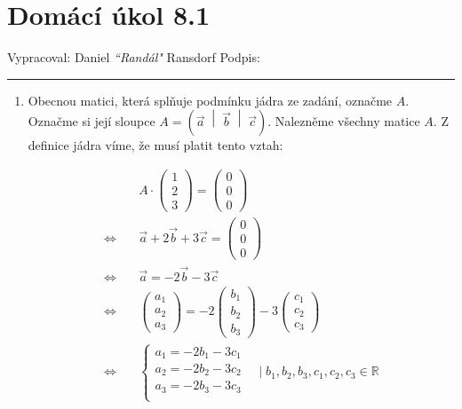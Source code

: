 \documentclass[12pt]{article}
\begin{document}
\section*{Domácí úkol 8.1}

Vypracoval: Daniel \textit{``Randál"} Ransdorf \hfill Podpis: \rule{4cm}{0.4pt}

\begin{enumerate}
  
  \item Obecnou matici, která splňuje podmínku jádra ze zadání, označme $A$. Označme si
    její sloupce $A = \left(\vec{a} \;\middle|\; \vec{b} \;\middle|\; \vec{c}\right)$.
    Nalezněme všechny matice $A$.
    Z definice jádra víme, že musí platit tento vztah:

    \begin{align*}
      &A \cdot \left(\begin{array}{c}
        1\\2\\3
      \end{array}\right) = \left(\begin{array}{c}
        0\\0\\0
      \end{array}\right) \\
      \Longleftrightarrow \quad
      &\vec{a} + 2\vec{b} + 3\vec{c} = \left(\begin{array}{c}
        0\\0\\0
      \end{array}\right) \\
      \Longleftrightarrow \quad
      &\vec{a} = -2\vec{b} - 3\vec{c} \\
      \Longleftrightarrow \quad
      &\left(\begin{array}{c}
        a_1 \\ a_2 \\ a_3
      \end{array}\right) = -2\left(\begin{array}{c}
        b_1 \\ b_2 \\ b_3
      \end{array}\right) - 3\left(\begin{array}{c}
        c_1 \\ c_2 \\ c_3
      \end{array}\right) \\
      \Longleftrightarrow \quad
      &\begin{cases}
        a_1 = -2b_1-3c_1 \\
        a_2 = -2b_2-3c_2 \\
        a_3 = -2b_3-3c_3 \\
      \end{cases} \quad | \;b_1, b_2, b_3, c_1, c_2, c_3 \in \mathbb{R}
    \end{align*}


\end{enumerate}
\end{document}
